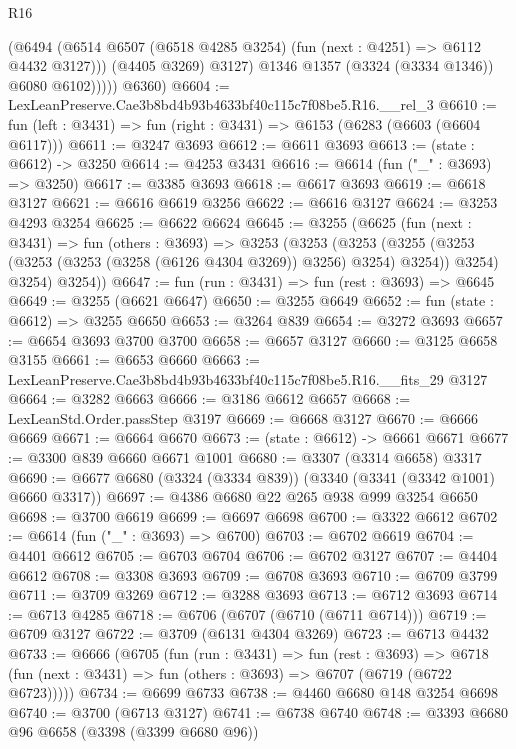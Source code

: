 \begin{lexlean}{R16}
\begin{coremodule}
                  (@6494
                    (@6514 @6507 (@6518 @4285 @3254) (fun (next : @4251) => @6112 @4432 @3127)))
                  (@4405 @3269)
                  @3127)
                @1346
                @1357
                (@3324 (@3334 @1346))
                @6080
                @6102)))))
      @6360)
@6604 := LexLeanPreserve.Cae3b8bd4b93b4633bf40c115c7f08be5.R16.__rel_3
@6610 := fun (left : @3431) => fun (right : @3431) => @6153 (@6283 (@6603 (@6604 @6117)))
@6611 := @3247 @3693
@6612 := @6611 @3693
@6613 := (state : @6612) -> @3250
@6614 := @4253 @3431
@6616 := @6614 (fun ("_" : @3693) => @3250)
@6617 := @3385 @3693
@6618 := @6617 @3693
@6619 := @6618 @3127
@6621 := @6616 @6619 @3256
@6622 := @6616 @3127
@6624 := @3253 @4293 @3254
@6625 := @6622 @6624
@6645 := @3255
    (@6625
      (fun (next : @3431) =>
      fun (others : @3693) =>
      @3253
        (@3253
          (@3253
            (@3255 (@3253 (@3253 (@3253 (@3258 (@6126 @4304 @3269)) @3256) @3254) @3254))
            @3254)
          @3254)
        @3254))
@6647 := fun (run : @3431) => fun (rest : @3693) => @6645
@6649 := @3255 (@6621 @6647)
@6650 := @3255 @6649
@6652 := fun (state : @6612) => @3255 @6650
@6653 := @3264 @839
@6654 := @3272 @3693
@6657 := @6654 @3693 @3700 @3700
@6658 := @6657 @3127
@6660 := @3125 @6658 @3155
@6661 := @6653 @6660
@6663 := LexLeanPreserve.Cae3b8bd4b93b4633bf40c115c7f08be5.R16.__fits_29 @3127
@6664 := @3282 @6663
@6666 := @3186 @6612 @6657
@6668 := LexLeanStd.Order.passStep @3197
@6669 := @6668 @3127
@6670 := @6666 @6669
@6671 := @6664 @6670
@6673 := (state : @6612) -> @6661 @6671
@6677 := @3300 @839 @6660 @6671 @1001
@6680 := @3307 (@3314 @6658) @3317
@6690 := @6677 @6680 (@3324 (@3334 @839)) (@3340 (@3341 (@3342 @1001) @6660 @3317))
@6697 := @4386 @6680 @22 @265 @938 @999 @3254 @6650
@6698 := @3700 @6619
@6699 := @6697 @6698
@6700 := @3322 @6612
@6702 := @6614 (fun ("_" : @3693) => @6700)
@6703 := @6702 @6619
@6704 := @4401 @6612
@6705 := @6703 @6704
@6706 := @6702 @3127
@6707 := @4404 @6612
@6708 := @3308 @3693
@6709 := @6708 @3693
@6710 := @6709 @3799
@6711 := @3709 @3269
@6712 := @3288 @3693
@6713 := @6712 @3693
@6714 := @6713 @4285
@6718 := @6706 (@6707 (@6710 (@6711 @6714)))
@6719 := @6709 @3127
@6722 := @3709 (@6131 @4304 @3269)
@6723 := @6713 @4432
@6733 := @6666
    (@6705
      (fun (run : @3431) =>
      fun (rest : @3693) =>
      @6718 (fun (next : @3431) => fun (others : @3693) => @6707 (@6719 (@6722 @6723)))))
@6734 := @6699 @6733
@6738 := @4460 @6680 @148 @3254 @6698
@6740 := @3700 (@6713 @3127)
@6741 := @6738 @6740
@6748 := @3393 @6680 @96 @6658 (@3398 (@3399 @6680 @96))

\end{coremodule}
\end{lexlean}
